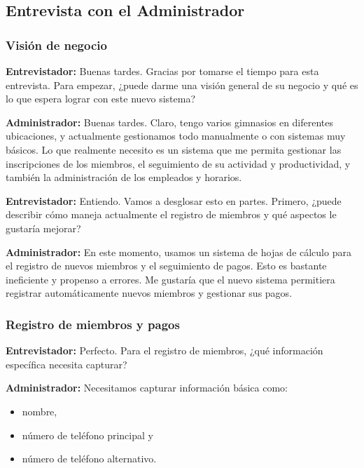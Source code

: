 \documentclass[spanish, 12pt]{article}
\providecommand{\tightlist}{\setlength{\itemsep}{0pt}
\setlength{\parskip}{0pt}}
\begin{document}
	\subsection{Entrevista con el Administrador}
	\label{entrevista-con-el-administrador}

	\subsubsection{Visión de negocio}
	\label{visiuxf3n-de-negocio}

	\textbf{Entrevistador:} Buenas tardes. Gracias por tomarse el tiempo para esta
	entrevista. Para empezar, ¿puede darme una visión general de su negocio y qué
	es lo que espera lograr con este nuevo sistema?

	\textbf{Administrador:} Buenas tardes. Claro, tengo varios gimnasios en diferentes
	ubicaciones, y actualmente gestionamos todo manualmente o con sistemas muy
	básicos. Lo que realmente necesito es un sistema que me permita gestionar las inscripciones
	de los miembros, el seguimiento de su actividad y productividad, y también la administración
	de los empleados y horarios.

	\textbf{Entrevistador:} Entiendo. Vamos a desglosar esto en partes. Primero, ¿puede
	describir cómo maneja actualmente el registro de miembros y qué aspectos le gustaría
	mejorar?

	\textbf{Administrador:} En este momento, usamos un sistema de hojas de cálculo
	para el registro de nuevos miembros y el seguimiento de pagos. Esto es
	bastante ineficiente y propenso a errores. Me gustaría que el nuevo sistema permitiera
	registrar automáticamente nuevos miembros y gestionar sus pagos.

	\subsubsection{Registro de miembros y pagos}
	\label{registro-de-miembros-y-pagos}

	\textbf{Entrevistador:} Perfecto. Para el registro de miembros, ¿qué información
	específica necesita capturar?

	\textbf{Administrador:} Necesitamos capturar información básica como:

	\begin{itemize}
		\tightlist

		\item nombre,

		\item número de teléfono principal y

		\item número de teléfono alternativo.
	\end{itemize}
\end{document}
